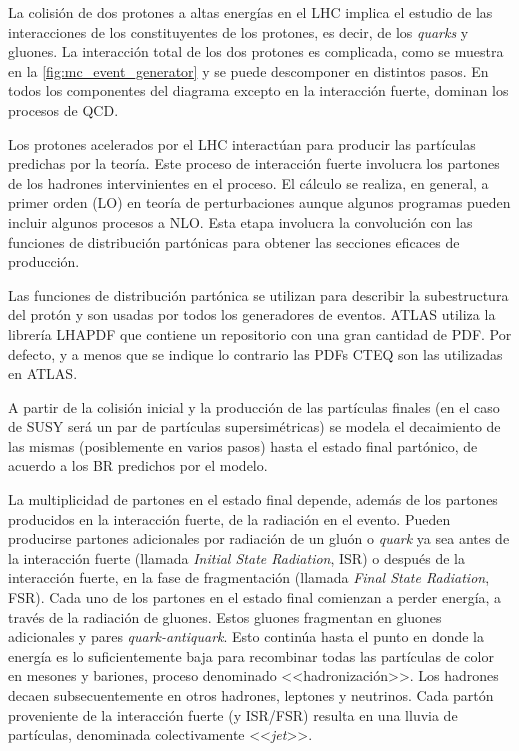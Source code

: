 La colisión de dos protones a altas energías en el LHC implica el estudio de las
interacciones de los constituyentes de los protones, es decir, de los \emph{quarks} y
gluones. La interacción total de los dos protones es complicada, como se muestra
en la \cref{fig:mc_event_generator} y se puede descomponer en distintos pasos.
En todos los componentes del diagrama excepto en la interacción fuerte, dominan los procesos de QCD.

Los protones acelerados por el LHC interactúan para producir las partículas
predichas por la teoría. Este proceso de interacción fuerte involucra los
partones de los hadrones intervinientes en el proceso. El cálculo se realiza, en
general, a primer orden (LO) en teoría de perturbaciones aunque algunos
programas pueden incluir algunos procesos a NLO. Esta etapa involucra la
convolución con las funciones de distribución partónicas para obtener las
secciones eficaces de producción.

Las funciones de distribución partónica se utilizan para describir la
subestructura del protón y son usadas por todos los generadores de eventos.
ATLAS utiliza la librería LHAPDF \cite{Bourilkov:2006cj} que contiene un
repositorio con una gran
cantidad de PDF. Por defecto, y a menos que se indique lo contrario las PDFs
CTEQ \cite{Nadolsky:2008zw} son las utilizadas en ATLAS.

A partir de la colisión inicial y la producción de las partículas finales (en el
caso de SUSY será un par de partículas supersimétricas) se
modela el decaimiento de las mismas (posiblemente en varios pasos) hasta el
estado final partónico, de acuerdo a los BR predichos por el modelo.

La multiplicidad de partones en el estado final depende, además de los partones producidos en la interacción
fuerte, de la radiación en el evento. Pueden producirse partones adicionales por
radiación de un gluón o \emph{quark} ya sea antes de la interacción fuerte (llamada
\emph{Initial State Radiation}, ISR) o después de la interacción fuerte, en la fase de
fragmentación (llamada \emph{Final State Radiation}, FSR).
Cada uno de los partones en el estado
final comienzan a perder energía, a través de la radiación de gluones. Estos
gluones fragmentan en gluones adicionales y pares \emph{quark-antiquark}. Esto continúa
hasta el punto en donde la energía es lo suficientemente baja para recombinar
todas las partículas de color en mesones y bariones, proceso denominado
<<hadronización>>. Los hadrones decaen subsecuentemente en otros hadrones,
leptones y neutrinos. Cada partón proveniente de la interacción fuerte (y
ISR/FSR) resulta en una lluvia de partículas, denominada colectivamente
<<\emph{jet}>>.


